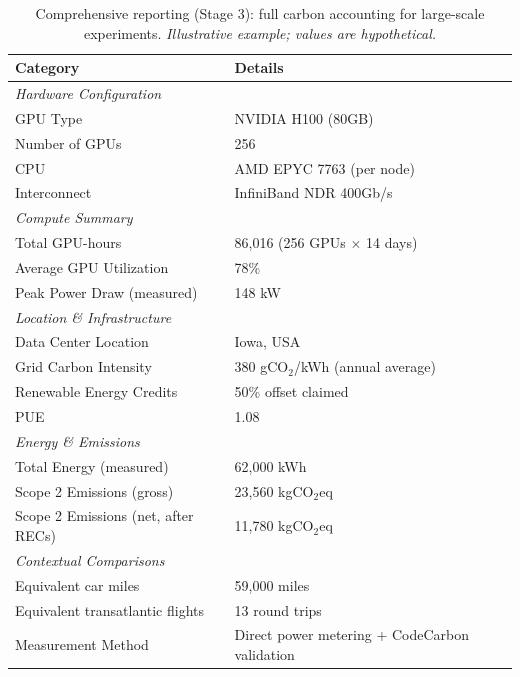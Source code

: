 \documentclass{article}
\theoremstyle{plain}
\theoremstyle{definition}
\theoremstyle{remark}
\begin{document}
\begin{table}[h]
\caption{Comprehensive reporting (Stage 3): full carbon accounting for large-scale experiments. \textit{Illustrative example; values are hypothetical.}}
\label{tab:heavy-report}
\begin{center}
\begin{tabular}{p{5cm}p{10cm}}
\toprule
\textbf{Category} & \textbf{Details} \\
\midrule
\multicolumn{2}{l}{\textit{Hardware Configuration}} \\
GPU Type & NVIDIA H100 (80GB) \\
Number of GPUs & 256 \\
CPU & AMD EPYC 7763 (per node) \\
Interconnect & InfiniBand NDR 400Gb/s \\
\midrule
\multicolumn{2}{l}{\textit{Compute Summary}} \\
Total GPU-hours & 86,016 (256 GPUs $\times$ 14 days) \\
Average GPU Utilization & 78\% \\
Peak Power Draw (measured) & 148 kW \\
\midrule
\multicolumn{2}{l}{\textit{Location \& Infrastructure}} \\
Data Center Location & Iowa, USA \\
Grid Carbon Intensity & 380 gCO$_2$/kWh (annual average) \\
Renewable Energy Credits & 50\% offset claimed \\
PUE & 1.08 \\
\midrule
\multicolumn{2}{l}{\textit{Energy \& Emissions}} \\
Total Energy (measured) & 62,000 kWh \\
Scope 2 Emissions (gross) & 23,560 kgCO$_2$eq \\
Scope 2 Emissions (net, after RECs) & 11,780 kgCO$_2$eq \\
\midrule
\multicolumn{2}{l}{\textit{Contextual Comparisons}} \\
Equivalent car miles & 59,000 miles \\
Equivalent transatlantic flights & 13 round trips \\
\midrule
Measurement Method & Direct power metering + CodeCarbon validation \\
\bottomrule
\end{tabular}
\end{center}
\end{table}

\clearpage
\end{document}
